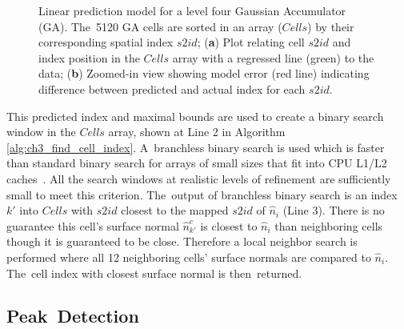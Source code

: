\begin{figure}[H]
\begin{subfigure}[t]{.35\linewidth}
    \caption{\label{fig:ch3_linear_interp_2}}
  \end{subfigure}
  \caption[Linear prediction model for space filling curve indices on a Gaussian Accumulator]{Linear prediction model for a level four Gaussian Accumulator (GA). The~5120 GA cells are sorted in an array ($Cells$) by their corresponding spatial index $s2id$;  (\textbf{a}) Plot relating cell $s2id$ and index position in the $Cells$ array with a regressed line (green) to the data; (\textbf{b})  Zoomed-in view showing model error (red line) indicating  difference between predicted and actual index for each $s2id$.  
  }\label{fig:ch3_linear_interp}
\end{figure}



This predicted index and maximal bounds are used to create a binary search window in the $Cells$ array, shown at Line 2 in Algorithm \ref{alg:ch3_find_cell_index}. A~branchless binary search is used which is faster than standard binary search for arrays of small sizes that fit into CPU L1/L2 caches~\cite{khuong_array_2017}. All the search windows at realistic levels of refinement are sufficiently small to meet this criterion. The~output of branchless binary search is an index $k'$ into $Cells$ with $s2id$ closest to the mapped $s2id$ of $\hat{n}_i$ (Line 3). There is no guarantee this cell's surface normal $\hat{n}^c_{k'}$ is closest to $\hat{n}_i$ than neighboring cells though it is guaranteed to be close. Therefore a local neighbor search is performed where all 12 neighboring cells' surface normals are compared to $\hat{n}_i$. The~cell index with closest surface normal is then~returned. 


\subsection{Peak~Detection}\label{sec:ch3_methods_fastga_peak}


